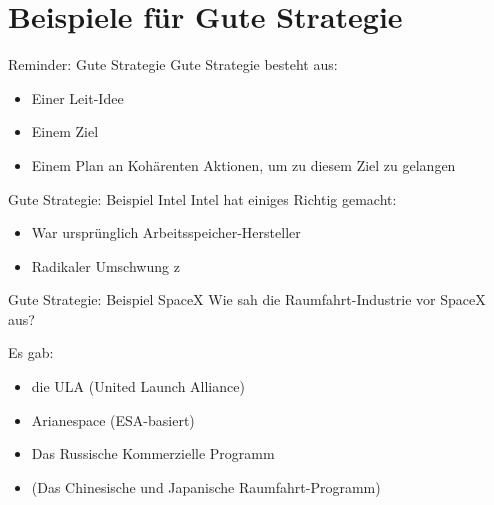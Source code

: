 



\section{Beispiele für Gute Strategie}

\begin{frame}{Reminder: Gute Strategie}
    Gute Strategie besteht aus:
    \begin{itemize}
        \item Einer Leit-Idee
        \item Einem Ziel
        \item Einem Plan an Kohärenten Aktionen, um zu diesem Ziel zu gelangen
    \end{itemize}
\end{frame}

\begin{frame}[c]{Gute Strategie: Beispiel Intel}
    Intel hat einiges Richtig gemacht:
    \begin{itemize}
        \item War ursprünglich Arbeitsspeicher-Hersteller \pause
        \item Radikaler Umschwung z
    \end{itemize}
\end{frame}



\begin{frame}[c]{Gute Strategie: Beispiel SpaceX}
    Wie sah die Raumfahrt-Industrie vor SpaceX aus? \pause
    

    Es gab:
    \begin{itemize}
        \item die ULA (United Launch Alliance)
        \item Arianespace (ESA-basiert)
        \item Das Russische Kommerzielle Programm
        \item (Das Chinesische und Japanische Raumfahrt-Programm)
    \end{itemize}

\end{frame}



